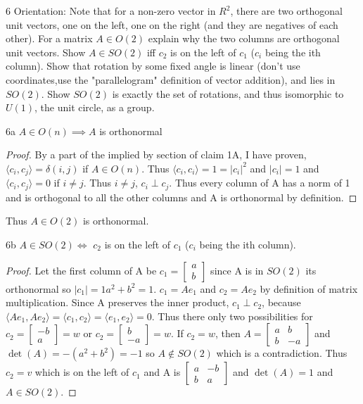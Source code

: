 \documentclass{article}
\newcommand{\abs}[1]{\lvert #1\rvert}
\newcommand{\angles}[1]{\langle{#1}\rangle}
\begin{document}
\bigskip

\begin{PROB}{6}\label{Problem 6.}
    Orientation: Note that for a non-zero vector in $R^2$, there are two orthogonal unit vectors, one on the left, one on the right (and they are negatives of each other).  For a matrix  $A \in O(2)$ explain why the two columns are orthogonal unit vectors. Show $A \in SO(2)$ iff $c_2$ is on the left of $c_1$  ($c_i$ being the ith column).  Show that rotation by some fixed angle is linear (don't use coordinates,use the "parallelogram" definition of vector addition), and lies in $SO(2)$. Show $SO(2)$ is exactly the set of rotations, and thus isomorphic to $U(1)$, the unit circle, as a group. 
\end{PROB}

\begin{claim}{6a}
    $A \in O(n) \implies A$ is orthonormal
\end{claim}
\begin{proof}
    By a part of the implied by section of claim 1A, I have proven, $\angles{c_i, c_j} = \delta(i, j)$ if $A \in O(n)$. Thus $\angles{c_i, c_i} = 1 = \abs{c_i}^2$ and $\abs{c_i} = 1$ and $\angles{c_i, c_j} = 0$ if $i \neq j$. Thus $i \neq j$, $c_i \perp c_j$. Thus every column of A has a norm of 1 and is orthogonal to all the other columns and A is orthonormal by definition.
\end{proof}

Thus $A \in O(2)$ is orthonormal.

\begin{claim}{6b}
    $A \in SO(2) \iff$ $c_2$ is on the left of $c_1$  ($c_i$ being the ith column).
\end{claim}
\begin{proof}
    Let the first column of A be $c_1 = \begin{bmatrix}
        a \\ b
    \end{bmatrix}$ since A is in $SO(2)$ its orthonormal so $\abs{c_1} = 1$$a^2 + b^2 = 1$. $c_1 = Ae_1$ and $c_2 = Ae_2$ by definition of matrix multiplication. Since A preserves the inner product, $c_1 \perp c_2$, because $\angles{Ae_1, Ae_2}  =\angles{c_1, c_2} = \angles{e_1, e_2} = 0$. Thus there only two possibilities for $c_2 = \begin{bmatrix}
        -b \\ a
    \end{bmatrix} = w$ or $c_2 = \begin{bmatrix}
        b \\ -a
    \end{bmatrix} = w$. If $c_2 = w$, then $A = \begin{bmatrix}
        a & b \\ b & -a
    \end{bmatrix}$ and $\det(A) = -(a^2 + b^2) = -1$ so $A \not \in SO(2)$ which is a contradiction. Thus $c_2 = v$ which is on the left of $c_1$ and A is $\begin{bmatrix}
        a & -b \\ b & a
    \end{bmatrix}$ and $\det(A) = 1$ and $A \in SO(2)$.
\end{proof}
\end{document}

